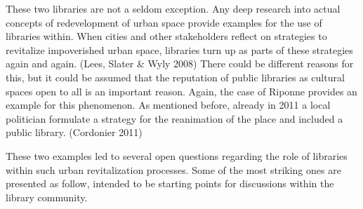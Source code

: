 \documentclass[a4paper,
fontsize=11pt,
oneside,
numbers=noperiodatend,
parskip=half-,
bibliography=totoc,
final
]{scrartcl}
\begin{document}
These two libraries are not a seldom exception. Any deep research into
actual concepts of redevelopment of urban space provide examples for the
use of libraries within. When cities and other stakeholders reflect on
strategies to revitalize impoverished urban space, libraries turn up as
parts of these strategies again and again. (Lees, Slater \& Wyly 2008)
There could be different reasons for this, but it could be assumed that
the reputation of public libraries as cultural spaces open to all is an
important reason. Again, the case of Riponne provides an example for
this phenomenon. As mentioned before, already in 2011 a local politician
formulate a strategy for the reanimation of the place and included a
public library. (Cordonier 2011)

These two examples led to several open questions regarding the role of
libraries within such urban revitalization processes. Some of the most
striking ones are presented as follow, intended to be starting points
for discussions within the library community.
\end{document}
